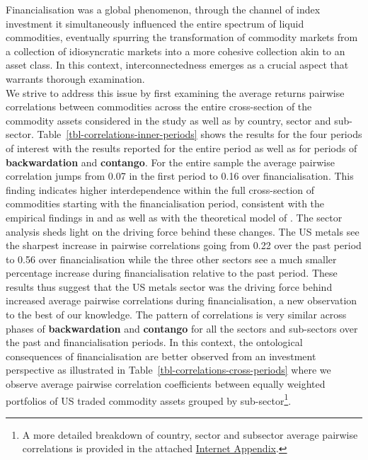 \documentclass[
  authoryear,
  preprint,
  3p]{elsarticle}
\begin{document}
\medskip

Financialisation was a global phenomenon, through the channel of index
investment it simultaneously influenced the entire spectrum of liquid
commodities, eventually spurring the transformation of commodity markets
from a collection of idiosyncratic markets into a more cohesive
collection akin to an asset class. In this context, interconnectedness
emerges as a crucial aspect that warrants thorough examination.\\
We strive to address this issue by first examining the average returns
pairwise correlations between commodities across the entire
cross-section of the commodity assets considered in the study as well as
by country, sector and sub-sector.
Table~\ref{tbl-correlations-inner-periods} shows the results for the
four periods of interest with the results reported for the entire period
as well as for periods of \textbf{backwardation} and \textbf{contango}.
For the entire sample the average pairwise correlation jumps from 0.07
in the first period to 0.16 over financialisation. This finding
indicates higher interdependence within the full cross-section of
commodities starting with the financialisation period, consistent with
the empirical findings in \citet{fryMcKibbin_evolution_2023} and
\citet{mayer_financialization_2017} as well as with the theoretical
model of \citet{basak_model_2016}. The sector analysis sheds light on
the driving force behind these changes. The US metals see the sharpest
increase in pairwise correlations going from 0.22 over the past period
to 0.56 over financialisation while the three other sectors see a much
smaller percentage increase during financialisation relative to the past
period. These results thus suggest that the US metals sector was the
driving force behind increased average pairwise correlations during
financialisation, a new observation to the best of our knowledge. The
pattern of correlations is very similar across phases of
\textbf{backwardation} and \textbf{contango} for all the sectors and
sub-sectors over the past and financialisation periods. In this context,
the ontological consequences of financialisation are better observed
from an investment perspective as illustrated in
Table~\ref{tbl-correlations-cross-periods} where we observe average
pairwise correlation coefficients between equally weighted portfolios of
US traded commodity assets grouped by sub-sector\footnote{A more
  detailed breakdown of country, sector and subsector average pairwise
  correlations is provided in the attached
  \href{https://bautheac.shinyapps.io/co-movement/}{Internet Appendix}.}.
\end{document}
